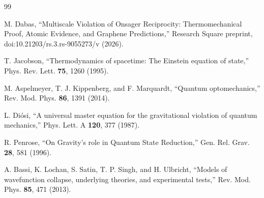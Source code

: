 \documentclass[prd,10pt,twocolumn]{revtex4-2}
\begin{document}
\begin{thebibliography}{99}

M. Dabas, ``Multiscale Violation of Onsager Reciprocity: Thermomechanical Proof, Atomic Evidence, and Graphene Predictions,'' Research Square preprint, doi:10.21203/rs.3.rs-9055273/v (2026).

T. Jacobson, ``Thermodynamics of spacetime: The Einstein equation of state,'' Phys. Rev. Lett. \textbf{75}, 1260 (1995).

M. Aspelmeyer, T. J. Kippenberg, and F. Marquardt, ``Quantum optomechanics,'' Rev. Mod. Phys. \textbf{86}, 1391 (2014).

L. Di\'osi, ``A universal master equation for the gravitational violation of quantum mechanics,'' Phys. Lett. A \textbf{120}, 377 (1987).

R. Penrose, ``On Gravity's role in Quantum State Reduction,'' Gen. Rel. Grav. \textbf{28}, 581 (1996).

A. Bassi, K. Lochan, S. Satin, T. P. Singh, and H. Ulbricht, ``Models of wavefunction collapse, underlying theories, and experimental tests,'' Rev. Mod. Phys. \textbf{85}, 471 (2013).

\end{thebibliography}
\end{document}
